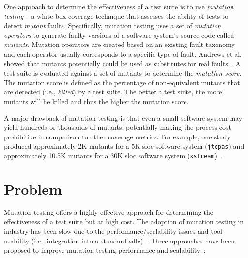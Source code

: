 One approach to determine the effectiveness of a test suite is to use \emph{mutation testing} -- a white box coverage technique that assesses the ability of tests to detect \emph{mutant} faults. Specifically, mutation testing uses a set of \emph{mutation operators} to generate faulty versions of a software system's source code called \emph{mutants}. Mutation operators are created based on an existing fault taxonomy and each operator usually corresponds to a specific type of fault. Andrews et al. showed that mutants potentially could be used as substitutes for real faults~\cite{ABLN06}. A test suite is evaluated against a set of mutants to determine the \emph{mutation score}. The mutation score is defined as the percentage of non-equivalent mutants that are detected (i.e., \emph{killed}) by a test suite. The better a test suite, the more mutants will be killed and thus the higher the mutation score.

A major drawback of mutation testing is that even a small software system may yield hundreds or thousands of mutants, potentially making the process cost prohibitive in comparison to other coverage metrics. For example, one study produced approximately 2K mutants for a 5K \gls{sloc} software system (\texttt{jtopas}) and approximately 10.5K mutants for a 30K \gls{sloc} software system (\texttt{xstream})~\cite{SZ09}.


\section{Problem}
\label{sec:introduction_problem}
Mutation testing offers a highly effective approach for determining the effectiveness of a test suite but at high cost. The adoption of mutation testing in industry has been slow due to the performance/scalability issues and tool usability (i.e., integration into a standard \gls{sdlc})~\cite{OU01}. Three approaches have been proposed to improve mutation testing performance and scalability~\cite{OU01}:

